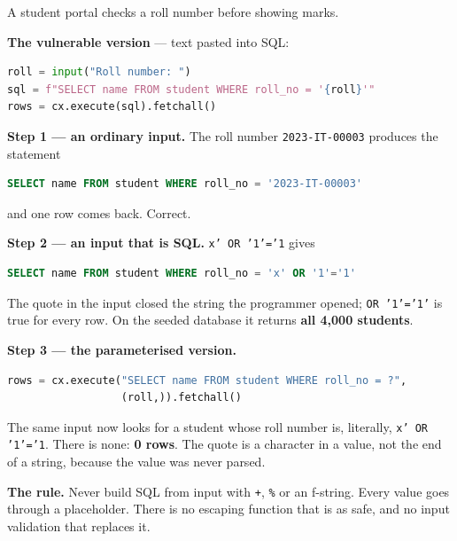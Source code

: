 \begin{worked}
A student portal checks a roll number before showing marks.

\medskip
\textbf{The vulnerable version} --- text pasted into SQL:
\begin{lstlisting}[language=python]
roll = input("Roll number: ")
sql = f"SELECT name FROM student WHERE roll_no = '{roll}'"
rows = cx.execute(sql).fetchall()
\end{lstlisting}

\textbf{Step 1 --- an ordinary input.} The roll number \texttt{2023-IT-00003}
produces the statement
\begin{lstlisting}[language=sql]
SELECT name FROM student WHERE roll_no = '2023-IT-00003'
\end{lstlisting}
and one row comes back. Correct.

\medskip
\textbf{Step 2 --- an input that is SQL.} \texttt{x' OR '1'='1} gives
\begin{lstlisting}[language=sql]
SELECT name FROM student WHERE roll_no = 'x' OR '1'='1'
\end{lstlisting}
The quote in the input closed the string the programmer opened; \texttt{OR
'1'='1'} is true for every row. On the seeded database it returns \textbf{all
4{,}000 students}.

\medskip
\textbf{Step 3 --- the parameterised version.}
\begin{lstlisting}[language=python]
rows = cx.execute("SELECT name FROM student WHERE roll_no = ?",
                  (roll,)).fetchall()
\end{lstlisting}
The same input now looks for a student whose roll number is, literally,
\texttt{x' OR '1'='1}. There is none: \textbf{0 rows}. The quote is a character
in a value, not the end of a string, because the value was never parsed.

\medskip
\textbf{The rule.} Never build SQL from input with \texttt{+}, \texttt{\%} or
an f-string. Every value goes through a placeholder. There is no escaping
function that is as safe, and no input validation that replaces it.
\end{worked}

